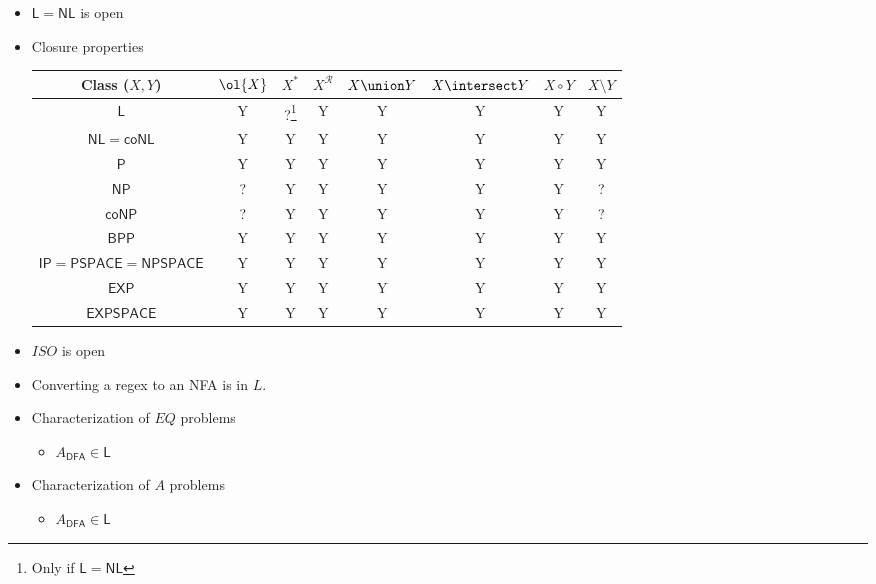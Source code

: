 \documentclass{scrartcl}
\begin{document}
\begin{itemize}
	\item \(\mathsf{L} = \mathsf{NL}\) is open
	\item Closure properties
	\begin{center}
		\begin{tabular}{c c c c c c c c} \toprule
			Class (\(X, Y\)) & \(\ol{X}\) & \(X^*\) & \(X^{\mathcal R}\) & \(X \union Y\) & \(X \intersect Y\) & \(X \circ Y\) & \(X \setminus Y\) \\ \midrule
			\(\mathsf{L}\) & Y & ?\footnote{Only if \(\mathsf{L} = \mathsf{NL}\)} & Y & Y & Y & Y & Y \\
			\(\mathsf{NL} = \mathsf{coNL}\) & Y & Y & Y & Y & Y & Y & Y \\
			\(\mathsf{P}\) & Y & Y & Y & Y & Y & Y & Y \\
			\(\mathsf{NP}\) & ? & Y & Y & Y & Y & Y & ? \\
			\(\mathsf{coNP}\) & ? & Y & Y & Y & Y & Y & ? \\
			\(\mathsf{BPP}\) & Y & Y & Y & Y & Y & Y & Y \\
			\(\mathsf{IP} = \mathsf{PSPACE} = \mathsf{NPSPACE}\) & Y & Y & Y & Y & Y & Y & Y \\
			\(\mathsf{EXP}\) & Y & Y & Y & Y & Y & Y & Y \\
			\(\mathsf{EXPSPACE}\) & Y & Y & Y & Y & Y & Y & Y \\ \bottomrule
		\end{tabular}
	\end{center}
	\item \(\textit{ISO}\) is open
	\item Converting a regex to an \textsf{NFA} is in \(L\).
	\item Characterization of \(EQ\) problems
	\begin{itemize}
		\item \(A_{\textsf{DFA}} \in \mathsf{L}\)
	\end{itemize}
	\item Characterization of \(A\) problems
	\begin{itemize}
		\item \(A_{\textsf{DFA}} \in \mathsf{L}\)
	\end{itemize}
\end{itemize}
\end{document}
